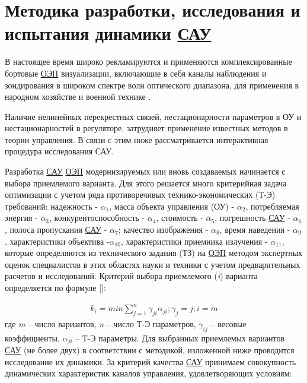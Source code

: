  


\section{Методика разработки, исследования и испытания динамики \hyperref[acroSAU]{САУ}} \label{sec:ch2/sec1-}

В настоящее время широко рекламируются и применяются комплексированные бортовые \hyperref[acroEOS]{ОЭП} визуализации, включающие в себя каналы наблюдения и зондирования в широком спектре волн оптического диапазона, для применения в народном хозяйстве и военной технике \cite{Tarasov,Belyakov,Torshina,Ivanov18}.

Наличие нелинейных перекрестных связей, нестационарности параметров в ОУ и нестационарностей в регуляторе, затрудняет применение известных методов в теории управления. В связи с этим ниже рассматривается интерактивная процедура  исследования САУ.

Разработка \hyperref[acroSAU]{САУ} \hyperref[acroEOS]{ОЭП} модернизируемых или вновь создаваемых начинается с выбора приемлемого варианта. Для этого решается много критерийная задача оптимизации с учетом ряда противоречивых технико-экономических (Т-Э) требований: 
надежность - $\alpha_{1}$, 
масса объекта управления (ОУ) - $\alpha_{2}$, 
потребляемая энергия - $\alpha_{3}$, 
конкурентоспособность - $\alpha_{4}$, 
стоимость - $\alpha_{5}$, 
погрешность \hyperref[acroSAU]{САУ} - $\alpha_{6}$, 
полоса пропускания \hyperref[acroSAU]{САУ} - $\alpha_{7}$; 
качество изображения - $\alpha_{8}$, 
время наведения - $\alpha_{9}$ , 
характеристики объектива -$\alpha_{10}$, 
характеристики приемника излучения - $\alpha_{11}$, которые определяются из технического задания (ТЗ) на \hyperref[acroEOS]{ОЭП} методом экспертных оценок специалистов в этих областях науки и техники с учетом предварительных расчетов и исследований. Критерий выбора приемлемого (\textit{i}) варианта определяется по формуле []:

\begin{equation}
\label{eq:p2:1}
\begin{alignedat}{2}
k_i=min\sum_{j=1}^n{\gamma _{ji}\alpha _{ji}}; \gamma _{j}=j ; i=m
\end{alignedat}
\end{equation}
где \textit{m} – число вариантов, \textit{n} – число Т-Э параметров, $\gamma_{ij}$ – весовые коэффициенты, $\alpha_{ji}$ – Т-Э параметры. Для выбранных приемлемых вариантов \hyperref[acroSAU]{САУ} (не более двух) в соответствии с методикой, изложенной ниже проводится исследование их динамики. За критерий качества \hyperref[acroSAU]{САУ} принимаем совокупность динамических характеристик каналов управления, удовлетворяющих условиям:

